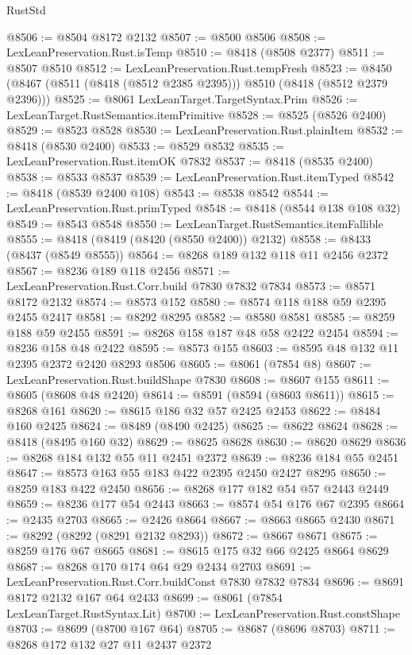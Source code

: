 \begin{lexlean}{RustStd}
\begin{coremodule}
@8506 := @8504 @8172 @2132
@8507 := @8500 @8506
@8508 := LexLeanPreservation.Rust.isTemp
@8510 := @8418 (@8508 @2377)
@8511 := @8507 @8510
@8512 := LexLeanPreservation.Rust.tempFresh
@8523 := @8450 (@8467 (@8511 (@8418 (@8512 @2385 @2395))) @8510 (@8418 (@8512 @2379 @2396)))
@8525 := @8061 LexLeanTarget.TargetSyntax.Prim
@8526 := LexLeanTarget.RustSemantics.itemPrimitive
@8528 := @8525 (@8526 @2400)
@8529 := @8523 @8528
@8530 := LexLeanPreservation.Rust.plainItem
@8532 := @8418 (@8530 @2400)
@8533 := @8529 @8532
@8535 := LexLeanPreservation.Rust.itemOK @7832
@8537 := @8418 (@8535 @2400)
@8538 := @8533 @8537
@8539 := LexLeanPreservation.Rust.itemTyped
@8542 := @8418 (@8539 @2400 @108)
@8543 := @8538 @8542
@8544 := LexLeanPreservation.Rust.primTyped
@8548 := @8418 (@8544 @138 @108 @32)
@8549 := @8543 @8548
@8550 := LexLeanTarget.RustSemantics.itemFallible
@8555 := @8418 (@8419 (@8420 (@8550 @2400)) @2132)
@8558 := @8433 (@8437 (@8549 @8555))
@8564 := @8268 @189 @132 @118 @11 @2456 @2372
@8567 := @8236 @189 @118 @2456
@8571 := LexLeanPreservation.Rust.Corr.build @7830 @7832 @7834
@8573 := @8571 @8172 @2132
@8574 := @8573 @152
@8580 := @8574 @118 @188 @59 @2395 @2455 @2417
@8581 := @8292 @8295
@8582 := @8580 @8581
@8585 := @8259 @188 @59 @2455
@8591 := @8268 @158 @187 @48 @58 @2422 @2454
@8594 := @8236 @158 @48 @2422
@8595 := @8573 @155
@8603 := @8595 @48 @132 @11 @2395 @2372 @2420 @8293 @8506
@8605 := @8061 (@7854 @8)
@8607 := LexLeanPreservation.Rust.buildShape @7830
@8608 := @8607 @155
@8611 := @8605 (@8608 @48 @2420)
@8614 := @8591 (@8594 (@8603 @8611))
@8615 := @8268 @161
@8620 := @8615 @186 @32 @57 @2425 @2453
@8622 := @8484 @160 @2425
@8624 := @8489 (@8490 @2425)
@8625 := @8622 @8624
@8628 := @8418 (@8495 @160 @32)
@8629 := @8625 @8628
@8630 := @8620 @8629
@8636 := @8268 @184 @132 @55 @11 @2451 @2372
@8639 := @8236 @184 @55 @2451
@8647 := @8573 @163 @55 @183 @422 @2395 @2450 @2427 @8295
@8650 := @8259 @183 @422 @2450
@8656 := @8268 @177 @182 @54 @57 @2443 @2449
@8659 := @8236 @177 @54 @2443
@8663 := @8574 @54 @176 @67 @2395
@8664 := @2435 @2703
@8665 := @2426 @8664
@8667 := @8663 @8665 @2430
@8671 := @8292 (@8292 (@8291 @2132 @8293))
@8672 := @8667 @8671
@8675 := @8259 @176 @67 @8665
@8681 := @8615 @175 @32 @66 @2425 @8664 @8629
@8687 := @8268 @170 @174 @64 @29 @2434 @2703
@8691 := LexLeanPreservation.Rust.Corr.buildConst @7830 @7832 @7834
@8696 := @8691 @8172 @2132 @167 @64 @2433
@8699 := @8061 (@7854 LexLeanTarget.RustSyntax.Lit)
@8700 := LexLeanPreservation.Rust.constShape
@8703 := @8699 (@8700 @167 @64)
@8705 := @8687 (@8696 @8703)
@8711 := @8268 @172 @132 @27 @11 @2437 @2372

\end{coremodule}
\end{lexlean}
